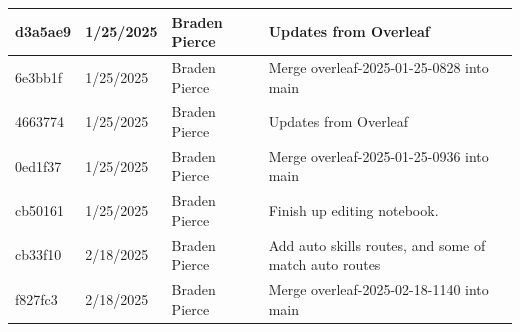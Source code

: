 \begin{center}
\begin{longtable}{|p{28pt}|p{33pt}|p{40pt}|p{300pt}|}
\hline
d3a5ae9 & 1/25/2025 & Braden Pierce & Updates from Overleaf \\
\hline
6e3bb1f & 1/25/2025 & Braden Pierce & Merge overleaf-2025-01-25-0828 into main \\
\hline
4663774 & 1/25/2025 & Braden Pierce & Updates from Overleaf \\
\hline
0ed1f37 & 1/25/2025 & Braden Pierce & Merge overleaf-2025-01-25-0936 into main \\
\hline
cb50161 & 1/25/2025 & Braden Pierce & Finish up editing notebook. \\
\hline
cb33f10 & 2/18/2025 & Braden Pierce & Add auto skills routes, and some of match auto routes \\
\hline
f827fc3 & 2/18/2025 & Braden Pierce & Merge overleaf-2025-02-18-1140 into main \\
\hline
\end{longtable}
\end{center}
